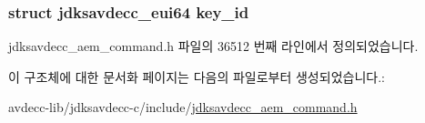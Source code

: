 \subsubsection[{\texorpdfstring{key\+\_\+id}{key_id}}]{\setlength{\rightskip}{0pt plus 5cm}struct {\bf jdksavdecc\+\_\+eui64} key\+\_\+id}\hypertarget{structjdksavdecc__aem__command__auth__get__key_a37cbdf6056556ccfaee3ab01dc7c3032}{}\label{structjdksavdecc__aem__command__auth__get__key_a37cbdf6056556ccfaee3ab01dc7c3032}


jdksavdecc\+\_\+aem\+\_\+command.\+h 파일의 36512 번째 라인에서 정의되었습니다.



이 구조체에 대한 문서화 페이지는 다음의 파일로부터 생성되었습니다.\+:\begin{DoxyCompactItemize}
\item 
avdecc-\/lib/jdksavdecc-\/c/include/\hyperlink{jdksavdecc__aem__command_8h}{jdksavdecc\+\_\+aem\+\_\+command.\+h}\end{DoxyCompactItemize}

